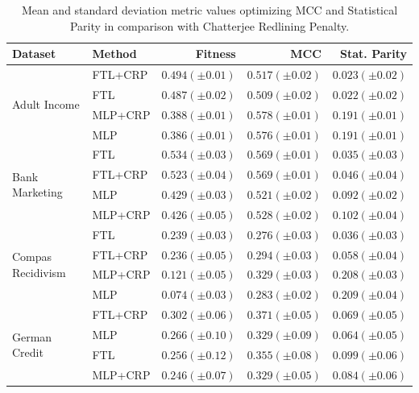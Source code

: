 \begin{table}
    \centering
    \caption{Mean and standard deviation metric values optimizing MCC and Statistical Parity in comparison with Chatterjee Redlining Penalty.}\label{tab:complete_mcc_parity_crp}
    {\footnotesize\begin{tabular}{llrrr}
    \toprule
    Dataset & Method & Fitness & MCC & Stat. Parity \\
    \midrule

    \multirow[t]{4}{*}{Adult Income} & FTL+CRP & $0.494 (\pm0.01)$ & $0.517 (\pm0.02)$ & $0.023 (\pm0.02)$ \\
     & FTL & $0.487 (\pm0.02)$ & $0.509 (\pm0.02)$ & $0.022 (\pm0.02)$ \\
     & MLP+CRP & $0.388 (\pm0.01)$ & $0.578 (\pm0.01)$ & $0.191 (\pm0.01)$ \\
     & MLP & $0.386 (\pm0.01)$ & $0.576 (\pm0.01)$ & $0.191 (\pm0.01)$ \\
    \midrule
    \multirow[t]{4}{*}{Bank Marketing} & FTL & $0.534 (\pm0.03)$ & $0.569 (\pm0.01)$ & $0.035 (\pm0.03)$ \\
     & FTL+CRP & $0.523 (\pm0.04)$ & $0.569 (\pm0.01)$ & $0.046 (\pm0.04)$ \\
     & MLP & $0.429 (\pm0.03)$ & $0.521 (\pm0.02)$ & $0.092 (\pm0.02)$ \\
     & MLP+CRP & $0.426 (\pm0.05)$ & $0.528 (\pm0.02)$ & $0.102 (\pm0.04)$ \\
    \midrule
    \multirow[t]{4}{*}{Compas Recidivism} & FTL & $0.239 (\pm0.03)$ & $0.276 (\pm0.03)$ & $0.036 (\pm0.03)$ \\
     & FTL+CRP & $0.236 (\pm0.05)$ & $0.294 (\pm0.03)$ & $0.058 (\pm0.04)$ \\
     & MLP+CRP & $0.121 (\pm0.05)$ & $0.329 (\pm0.03)$ & $0.208 (\pm0.03)$ \\
     & MLP & $0.074 (\pm0.03)$ & $0.283 (\pm0.02)$ & $0.209 (\pm0.04)$ \\
    \midrule
    \multirow[t]{4}{*}{German Credit} & FTL+CRP & $0.302 (\pm0.06)$ & $0.371 (\pm0.05)$ & $0.069 (\pm0.05)$ \\
     & MLP & $0.266 (\pm0.10)$ & $0.329 (\pm0.09)$ & $0.064 (\pm0.05)$ \\
     & FTL & $0.256 (\pm0.12)$ & $0.355 (\pm0.08)$ & $0.099 (\pm0.06)$ \\
     & MLP+CRP & $0.246 (\pm0.07)$ & $0.329 (\pm0.05)$ & $0.084 (\pm0.06)$ \\
     \bottomrule
\end{tabular}}
\end{table}

